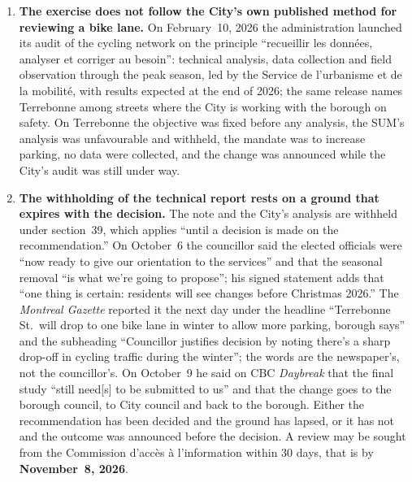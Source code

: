 \documentclass[10pt,letterpaper]{article}
\begin{document}
\begin{enumerate}[nosep,itemsep=0.3em,leftmargin=1.4em]
\begin{minipage}[t]{\linewidth}
    and the analysis on which the ruling-out rests is in the withheld note.\end{minipage}\vspace{0.35em}
\item \begin{minipage}[t]{\linewidth}\textbf{The exercise does not follow the City's own published method
    for reviewing a bike lane.} On February~10, 2026 the administration
    launched its audit of the cycling network on the principle ``recueillir
    les donn\'ees, analyser et corriger au besoin'': technical analysis, data
    collection and field observation through the peak season, led by the
    Service de l'urbanisme et de la mobilit\'e, with results expected at the
    end of 2026; the same release names Terrebonne among streets where the
    City is working with the borough on safety. On Terrebonne the objective
    was fixed before any analysis, the SUM's analysis was unfavourable and
    withheld, the mandate was to increase parking, no data were collected,
    and the change was announced while the City's audit was still under
    way.\end{minipage}\vspace{0.35em}
\item \begin{minipage}[t]{\linewidth}\textbf{The withholding of the technical report rests on a ground
    that expires with the decision.} The note and the City's analysis are withheld under
    section~39, which applies ``until a decision is made on the
    recommendation.'' On October~6 the councillor said the elected officials
    were ``now ready to give our orientation to the services'' and that the
    seasonal removal ``is what we're going to propose''; his signed
    statement adds that ``one thing is certain: residents will see changes
    before Christmas 2026.'' The \emph{Montreal Gazette} reported it the
    next day under the headline ``Terrebonne St.~will drop to one bike lane
    in winter to allow more parking, borough says'' and the subheading
    ``Councillor justifies decision by noting there's a sharp drop-off in
    cycling traffic during the winter''; the words are the newspaper's, not
    the councillor's. On October~9 he said on CBC \emph{Daybreak} that the
    final study ``still need[s] to be submitted to us'' and that the change
    goes to the borough council, to City council and back to the borough.
    Either the recommendation has been decided and
    the ground has lapsed, or it has not and the outcome was announced
    before the decision. A
    review may be sought from the Commission d'acc\`es \`a l'information
    within 30 days, that is by \textbf{November~8, 2026}.\end{minipage}\vspace{0.35em}
\end{enumerate}
\end{document}
